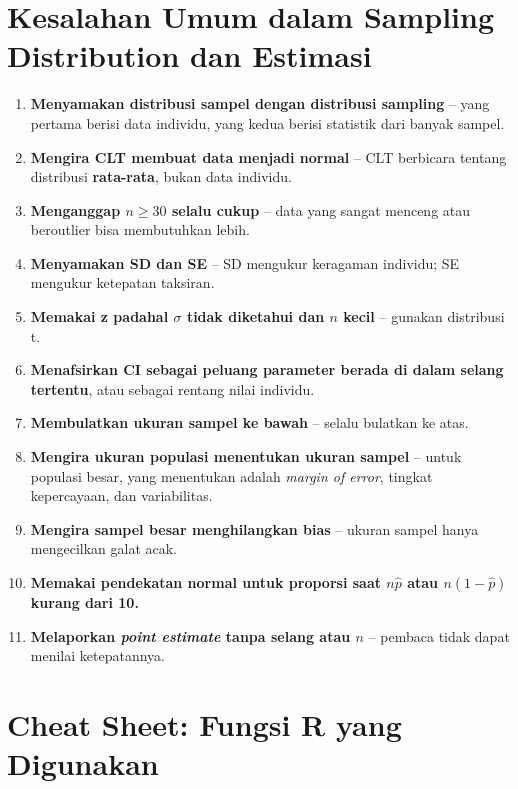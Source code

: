\documentclass[
  indonesian,
  letterpaper,
]{book}
\providecommand{\tightlist}{%
  \setlength{\itemsep}{0pt}\setlength{\parskip}{0pt}}
\begin{document}

\chapter{Kesalahan Umum dalam Sampling Distribution dan
Estimasi}\label{kesalahan-umum-dalam-sampling-distribution-dan-estimasi}

\begin{enumerate}
\def\labelenumi{\arabic{enumi}.}
\tightlist
\item
  \textbf{Menyamakan distribusi sampel dengan distribusi sampling} --
  yang pertama berisi data individu, yang kedua berisi statistik dari
  banyak sampel.
\item
  \textbf{Mengira CLT membuat data menjadi normal} -- CLT berbicara
  tentang distribusi \textbf{rata-rata}, bukan data individu.
\item
  \textbf{Menganggap \(n \ge 30\) selalu cukup} -- data yang sangat
  menceng atau beroutlier bisa membutuhkan lebih.
\item
  \textbf{Menyamakan SD dan SE} -- SD mengukur keragaman individu; SE
  mengukur ketepatan taksiran.
\item
  \textbf{Memakai z padahal \(\sigma\) tidak diketahui dan \(n\) kecil}
  -- gunakan distribusi t.
\item
  \textbf{Menafsirkan CI sebagai peluang parameter berada di dalam
  selang tertentu}, atau sebagai rentang nilai individu.
\item
  \textbf{Membulatkan ukuran sampel ke bawah} -- selalu bulatkan ke
  atas.
\item
  \textbf{Mengira ukuran populasi menentukan ukuran sampel} -- untuk
  populasi besar, yang menentukan adalah \emph{margin of error}, tingkat
  kepercayaan, dan variabilitas.
\item
  \textbf{Mengira sampel besar menghilangkan bias} -- ukuran sampel
  hanya mengecilkan galat acak.
\item
  \textbf{Memakai pendekatan normal untuk proporsi saat \(n\hat{p}\)
  atau \(n(1-\hat{p})\) kurang dari 10.}
\item
  \textbf{Melaporkan \emph{point estimate} tanpa selang atau \(n\)} --
  pembaca tidak dapat menilai ketepatannya.
\end{enumerate}


\chapter{Cheat Sheet: Fungsi R yang
Digunakan}\label{cheat-sheet-fungsi-r-yang-digunakan}
\end{document}
